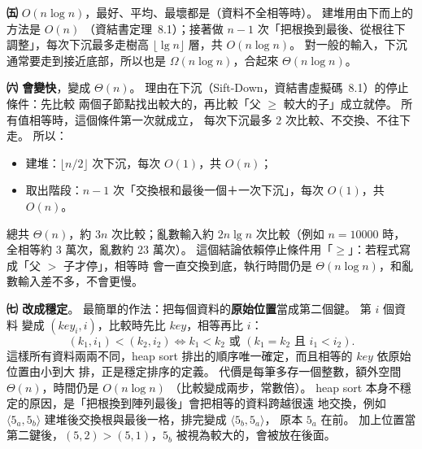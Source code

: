 \begin{pastsoln}
\textbf{㈤} $O(n \log n)$，最好、平均、最壞都是（資料不全相等時）。 建堆用由下而上的方法是 $O(n)$
（資結書定理~8.1）；接著做 $n - 1$ 次「把根換到最後、從根往下調整」，每次下沉最多走樹高
$\lfloor \lg n \rfloor$ 層，共 $O(n \log n)$。 對一般的輸入，下沉通常要走到接近底部，所以也是
$\Omega(n \log n)$，合起來 $\Theta(n \log n)$。

\textbf{㈥ 會變快}，變成 $\Theta(n)$。 理由在下沉（Sift-Down，資結書虛擬碼~8.1）的停止條件：先比較
兩個子節點找出較大的，再比較「父 $\ge$ 較大的子」成立就停。 所有值相等時，這個條件第一次就成立，
每次下沉最多 $2$ 次比較、不交換、不往下走。 所以：
\begin{itemize}
\item 建堆：$\lfloor n/2 \rfloor$ 次下沉，每次 $O(1)$，共 $O(n)$；
\item 取出階段：$n - 1$ 次「交換根和最後一個＋一次下沉」，每次 $O(1)$，共 $O(n)$。
\end{itemize}
總共 $\Theta(n)$，約 $3n$ 次比較；亂數輸入約 $2n \lg n$ 次比較（例如 $n = 10000$ 時，全相等約 $3$
萬次，亂數約 $23$ 萬次）。 這個結論依賴停止條件用「$\ge$」：若程式寫成「父 $>$ 子才停」，相等時
會一直交換到底，執行時間仍是 $\Theta(n \log n)$，和亂數輸入差不多，不會更慢。

\textbf{㈦ 改成穩定}。 最簡單的作法：把每個資料的\textbf{原始位置}當成第二個鍵。 第 $i$ 個資料
變成 $(\mathit{key}_i, i)$，比較時先比 $\mathit{key}$，相等再比 $i$：
\[
(k_1, i_1) < (k_2, i_2) \iff k_1 < k_2 \text{ 或 } (k_1 = k_2 \text{ 且 } i_1 < i_2) .
\]
這樣所有資料兩兩不同，heap sort 排出的順序唯一確定，而且相等的 $\mathit{key}$ 依原始位置由小到大
排，正是穩定排序的定義。 代價是每筆多存一個整數，額外空間 $\Theta(n)$，時間仍是 $O(n \log n)$
（比較變成兩步，常數倍）。 heap sort 本身不穩定的原因，是「把根換到陣列最後」會把相等的資料跨越很遠
地交換，例如 $\langle 5_a, 5_b \rangle$ 建堆後交換根與最後一格，排完變成 $\langle 5_b, 5_a\rangle$，
原本 $5_a$ 在前。 加上位置當第二鍵後，$(5, 2) > (5, 1)$，$5_b$ 被視為較大的，會被放在後面。
\end{pastsoln}
